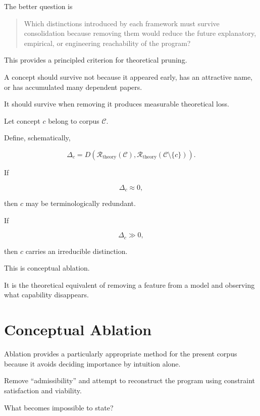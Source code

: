 \documentclass[11pt]{article}
\theoremstyle{remark}
\newcommand{\Reach}{\mathcal{R}}
\begin{document}
The better question is

\begin{quote}
Which distinctions introduced by each framework must survive consolidation because removing them would reduce the future explanatory, empirical, or engineering reachability of the program?
\end{quote}

This provides a principled criterion for theoretical pruning.

A concept should survive not because it appeared early, has an attractive name, or has accumulated many dependent papers.

It should survive when removing it produces measurable theoretical loss.

Let concept $c$ belong to corpus $\mathcal{C}$.

Define, schematically,

\begin{equation}
\Delta_c
=
D
\left(
\Reach_{\mathrm{theory}}(\mathcal{C}),
\Reach_{\mathrm{theory}}(\mathcal{C}\setminus\{c\})
\right).
\end{equation}

If

\begin{equation}
\Delta_c\approx0,
\end{equation}

then $c$ may be terminologically redundant.

If

\begin{equation}
\Delta_c\gg0,
\end{equation}

then $c$ carries an irreducible distinction.

This is conceptual ablation.

It is the theoretical equivalent of removing a feature from a model and observing what capability disappears.

\section{Conceptual Ablation}

Ablation provides a particularly appropriate method for the present corpus because it avoids deciding importance by intuition alone.

Remove ``admissibility'' and attempt to reconstruct the program using constraint satisfaction and viability.

What becomes impossible to state?
\end{document}
